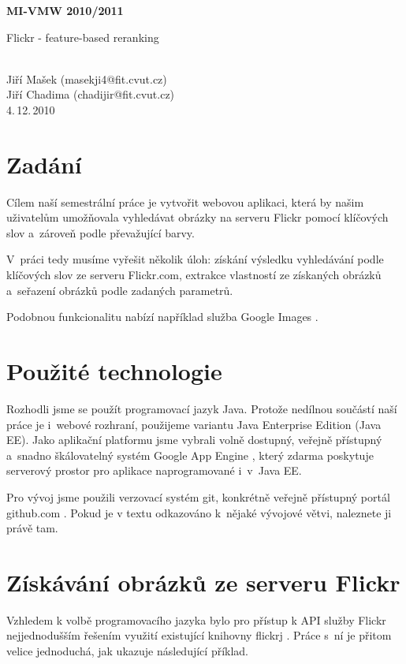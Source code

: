 \documentclass[12pt,oneside,a4paper]{article}
\begin{document}
\begin{center}
\bf MI-VMW 2010/2011\\[2mm]
    \begin{Large}Flickr - feature-based reranking\end{Large}\\[3mm]
       Jiří Mašek (masekji4@fit.cvut.cz)\\
       Jiří Chadima (chadijir@fit.cvut.cz)\\
4.\,12.\,2010
\end{center}

\section{Zadání}
Cílem naší semestrální práce je vytvořit webovou aplikaci, která by našim uživatelům umožňovala vyhledávat obrázky na serveru Flickr \cite{flickr} pomocí klíčových slov a~zároveň podle převažující barvy.

V~práci tedy musíme vyřešit několik úloh: získání výsledku vyhledávání podle klíčových slov ze serveru Flickr.com, extrakce vlastností ze získaných obrázků a~seřazení obrázků podle zadaných parametrů.

Podobnou funkcionalitu nabízí například služba Google Images \cite{GoogleImages}.

\section{Použité technologie}

Rozhodli jsme se použít programovací jazyk Java. Protože nedílnou součástí naší práce je i~webové rozhraní, použijeme variantu Java Enterprise Edition (Java EE). Jako aplikační platformu jsme vybrali volně dostupný, veřejně přístupný a~snadno škálovatelný systém Google App Engine \cite{GoogleAE}, který zdarma poskytuje serverový prostor pro aplikace naprogramované i~v~Java EE.

Pro vývoj jsme použili verzovací systém git, konkrétně veřejně přístupný portál github.com \cite{official}. Pokud je v textu odkazováno k~nějaké vývojové větvi, naleznete ji právě tam.

\section{Získávání obrázků ze serveru Flickr}
Vzhledem k volbě programovacího jazyka bylo pro přístup k API služby Flickr nejjednodušším řešením využití existující knihovny flickrj \cite{flickrj}. Práce s~ní je přitom velice jednoduchá, jak ukazuje následující příklad.
\end{document}
